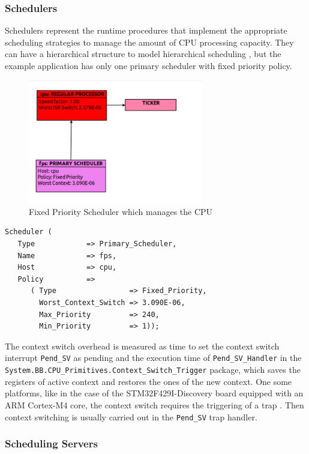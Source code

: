 \documentclass{article}
\begin{document}
\subsubsection{Schedulers}

Schedulers represent the runtime procedures that implement the appropriate scheduling strategies to manage the amount of CPU processing capacity. They can have a hierarchical structure to model hierarchical scheduling \cite{hierarchical-scheduling}, but the example application has only one primary scheduler with fixed priority policy.

\begin{figure}[!htbp]
\centering
\includegraphics[width=3in]{images/primary-scheduler}
\caption{Fixed Priority Scheduler which manages the CPU}
\label{primary-scheduler}
\end{figure}

\begin{lstlisting}
Scheduler (
   Type            => Primary_Scheduler,
   Name            => fps,
   Host            => cpu,
   Policy          =>
      ( Type                 => Fixed_Priority,
        Worst_Context_Switch => 3.090E-06,
        Max_Priority         => 240,
        Min_Priority         => 1));
\end{lstlisting}

The context switch overhead is measured as time to set the context switch interrupt \texttt{Pend\_SV} as pending and the execution time of \texttt{Pend\_SV\_Handler} in the \texttt{System.BB.CPU\_Primitives.Context\_Switch\_Trigger} package, which saves the registers of active context and restores the ones of the new context. One some platforms, like in the case of the STM32F429I-Discovery board equipped with an ARM Cortex-M4 core, the context switch requires the triggering of a trap \cite{pendsv}. Then context switching is usually carried out in the \texttt{Pend\_SV} trap handler.

\subsubsection{Scheduling Servers}
\end{document}
